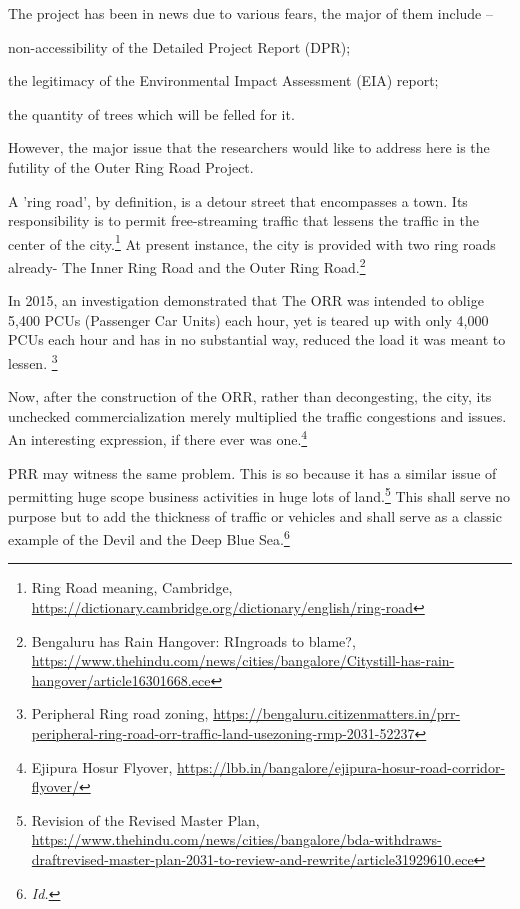 \begin{multicols}{2}

\noi
The project has been in news due to various fears, the major of them include –

\noi
non-accessibility of the Detailed Project Report (DPR);

\noi
the legitimacy of the Environmental Impact Assessment (EIA) report;

\noi
the quantity of trees which will be felled for it. 

\noi
However, the major issue that the researchers would like to address here is the futility of the Outer Ring Road Project.

\noi
A 'ring road', by definition, is a detour street that encompasses a town. Its responsibility is to
permit free-streaming traffic that lessens the traffic in the center of the city.\footnote{Ring Road meaning, Cambridge, \url{https://dictionary.cambridge.org/dictionary/english/ring-road}} At present
instance, the city is provided with two ring roads already- The Inner Ring Road and the Outer
Ring Road.\footnote{Bengaluru has Rain Hangover: RIngroads to blame?, \url{https://www.thehindu.com/news/cities/bangalore/Citystill-has-rain-hangover/article16301668.ece}}

\noi
In 2015, an investigation demonstrated that The ORR was intended to oblige 5,400 PCUs
(Passenger Car Units) each hour, yet is teared up with only 4,000 PCUs each hour and has in
no substantial way, reduced the load it was meant to lessen. \footnote{Peripheral Ring road zoning, \url{https://bengaluru.citizenmatters.in/prr-peripheral-ring-road-orr-traffic-land-usezoning-rmp-2031-52237}}

\noi
Now, after the construction of the ORR, rather than decongesting, the city, its unchecked
commercialization merely multiplied the traffic congestions and issues. An interesting
expression, if there ever was one.\footnote{Ejipura Hosur Flyover, \url{https://lbb.in/bangalore/ejipura-hosur-road-corridor-flyover/}}

\noi
PRR may witness the same problem. This is so because it has a similar issue of permitting
huge scope business activities in huge lots of land.\footnote{Revision of the Revised Master Plan, \url{https://www.thehindu.com/news/cities/bangalore/bda-withdraws-draftrevised-master-plan-2031-to-review-and-rewrite/article31929610.ece}} This shall serve no purpose but to add the thickness of traffic or vehicles and shall serve as a classic example of the Devil and the Deep
Blue Sea.\footnote{\textit{Id.}}


\end{multicols}
